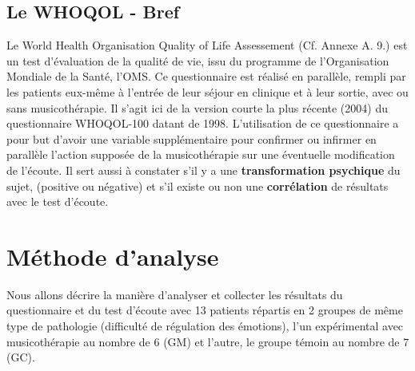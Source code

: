 \subsection* {Le WHOQOL  - Bref}  
Le World Health 	Organisation Quality of Life Assessement  (Cf. Annexe A. 9.) 
est un test d'évaluation de la qualité de vie, issu du
programme de l'Organisation Mondiale de la Santé, l'OMS.
Ce questionnaire est réalisé en parallèle, rempli par
les patients eux-même à l'entrée de leur séjour en clinique et
à leur sortie, avec ou sans musicothérapie.
Il s'agit ici de la version courte  la plus récente (2004) du questionnaire
WHOQOL-100 datant de 1998.
L'utilisation de ce questionnaire a pour but d'avoir
une variable supplémentaire pour confirmer ou infirmer en
parallèle l'action supposée  de la musicothérapie sur une éventuelle
modification de l'écoute.
Il sert aussi à constater s'il y a une\textbf{ transformation psychique }du sujet,
(positive ou négative) et s'il existe ou non une \textbf{corrélation }de
résultats avec le test d'écoute.

\section{Méthode d'analyse}
Nous allons décrire la manière d'analyser et collecter les résultats du questionnaire et du test d'écoute 
avec 13 patients répartis en 2 groupes de même type de pathologie (difficulté de régulation des 
émotions), l'un expérimental avec musicothérapie au nombre de 6 (GM) et l'autre, le groupe témoin au 
nombre 
de 7 (GC).
